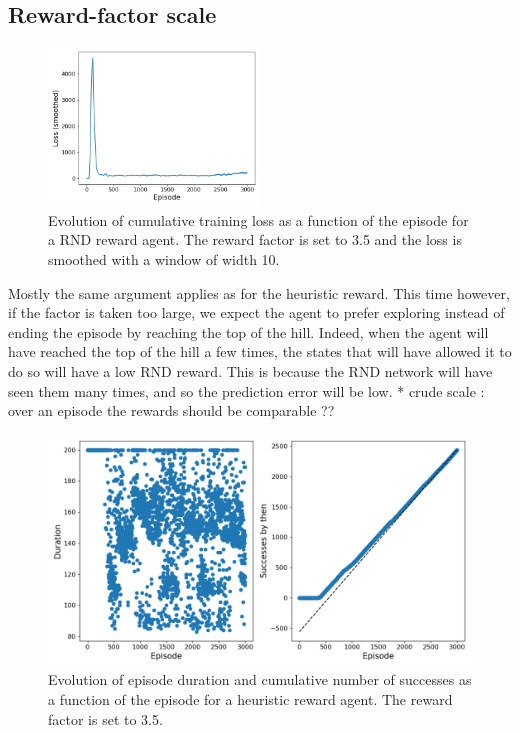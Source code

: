 \documentclass[a4paper, 12pt,oneside]{article}
\begin{document}
            \subsection{Reward-factor scale}
            \begin{figure}
                \centering
                \vspace{-1em}
                \includegraphics[width=0.5\textwidth]{../runs/dqn_rnd/up-tau=1_r-fact=35.0/figs/loss}
                \caption{Evolution of cumulative training loss as a function of the episode for a RND reward agent. The reward factor is set to 3.5 and the loss is smoothed with a window of width 10.}
                \label{fig:dqn-rnd-r-fact=35-loss}
            \end{figure}
            Mostly the same argument applies as for the heuristic reward. This time however, if the factor is taken too large, we expect the agent to prefer exploring instead of ending the episode by reaching the top of the hill. Indeed, when the agent will have reached the top of the hill a few times, the states that will have allowed it to do so will have a low RND reward. This is because the RND network will have seen them many times, and so the prediction error will be low.
            * crude scale : over an episode the rewards should be comparable ?? 
          \begin{figure}[h!]
            \centering
            \vspace{0em}
            \includegraphics[width=.75\textwidth]{../runs/dqn_rnd/up-tau=1_r-fact=35.0/figs/duration}
            \caption{Evolution of episode duration and cumulative number of successes as a function of the episode for a heuristic reward agent. The reward factor is set to 3.5.}
            \label{fig:dqn-rnd-r-fact=35-duration}
        \end{figure}
\end{document}

